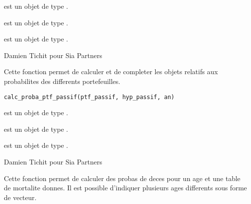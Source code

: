 \documentclass[a4paper]{book}
\begin{document}
%
\begin{Arguments}
\begin{ldescription}
\item[\code{epargne}] est un objet de type .

\item[\code{hyp\_passif}] est un objet de type .

\item[\code{an}] est un objet de type .
\end{ldescription}
\end{Arguments}
%
\begin{Author}\relax
Damien Tichit pour Sia Partners
\end{Author}
%
\begin{Description}\relax
Cette fonction permet de calculer et de completer les objets relatifs aux probabilites des differents portefeuilles.
\end{Description}
%
\begin{Usage}
\begin{verbatim}
calc_proba_ptf_passif(ptf_passif, hyp_passif, an)
\end{verbatim}
\end{Usage}
%
\begin{Arguments}
\begin{ldescription}
\item[\code{ptf\_passif}] est un objet de type .

\item[\code{hyp\_passif}] est un objet de type .

\item[\code{an}] est un objet de type .
\end{ldescription}
\end{Arguments}
%
\begin{Author}\relax
Damien Tichit pour Sia Partners
\end{Author}
%
\begin{Description}\relax
Cette fonction permet de calculer des probas de deces pour un age et une table de mortalite donnes.
Il est possible d'indiquer plusieurs ages differents sous forme de vecteur.
\end{Description}
\end{document}

